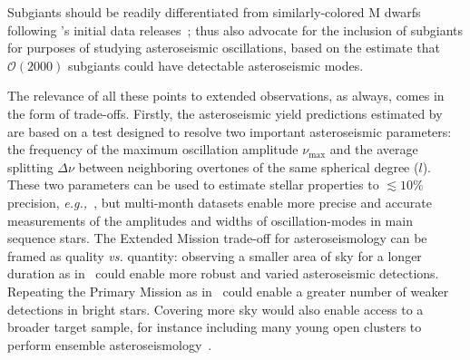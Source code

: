 Subgiants should be readily differentiated from similarly-colored M dwarfs following \gaia\!'s initial data releases~\citep{perryman_gaia_2002};
  thus also advocate for the inclusion of subgiants for purposes of studying asteroseismic oscillations, based on the estimate that $\mathcal{O}(2000)$ subgiants could have detectable asteroseismic modes.

The relevance of all these points to extended \tess observations, as always, comes in the form of trade-offs.
Firstly, the asteroseismic yield predictions estimated by~ are based on a test designed to resolve two important asteroseismic parameters: the frequency of the maximum oscillation amplitude $\nu_{\mathrm{max}}$ and the average splitting $\Delta \nu$ between neighboring overtones of the same spherical degree ($l$).
These two parameters can be used to estimate stellar properties to $\lesssim 10\%$ precision, \textit{e.g.,}~\citep{aguirre_verifying_2012}, but multi-month datasets enable more precise and accurate measurements of the amplitudes and widths of oscillation-modes in main sequence stars.
The Extended Mission trade-off for asteroseismology can be framed as quality \textit{vs.} quantity: observing a smaller area of sky for a longer duration as in \npole\ could enable more robust and varied asteroseismic detections.
Repeating the Primary Mission as in \nhemi\ could enable a greater number of weaker detections in bright stars.
Covering more sky would also enable access to a broader target sample, for instance including many young open clusters to perform ensemble asteroseismology~\citep{aerts_ensemble_2013}.

\begin{comment}
\paragraph{Measuring rotation periods for a large sample of stars}
Another reason to observing more rather than less sky is to enable measurements of rotation periods for the largest possible sample of stars.
For instance~\citet{nielsen_rotation_2013} reported rotation periods derived from starspot variability for 12151 \kepler stars.
Such studies (cf their introduction) are important for studies of stellar evolution and stellar dynamos.

They also bear upon radial velocity searches for exoplanets, in which stellar activity can effectively `mask' planetary orbital periods commensurate with the stellar rotation period.
The matters for prospects of detecting small planets in the habitable zones of M dwarfs~\citep{newton_HZ_2016}.

THIS ALSO MATTERS FOR STELLAR ACTIVITY STUDIES.
Long timescale characterization of stellar activity
E.g. through spot detection, or other indicators of stellar magnetic activity.
\end{comment}

